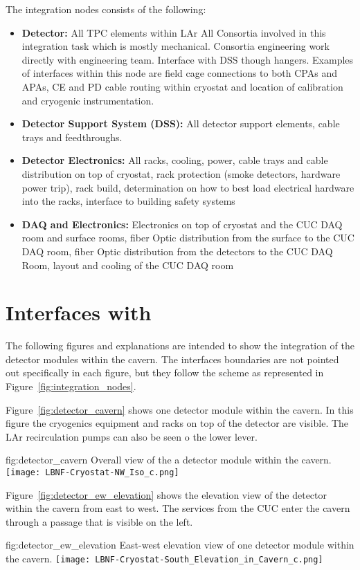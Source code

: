 The integration nodes consists of the following:
\begin{itemize}
\item {\bf Detector:} All TPC elements within LAr All Consortia involved in
  this integration task which is mostly mechanical. Consortia
  engineering work directly with  engineering team.
  Interface with DSS though hangers. Examples of interfaces within
  this node are field cage connections to both CPAs and APAs, CE and
  PD cable routing within cryostat and location of calibration and
  cryogenic instrumentation.
\item {\bf Detector Support System (DSS):} All detector support elements,
  cable trays and feedthroughs.
\item {\bf Detector Electronics:} All racks, cooling, power, cable
  trays and cable distribution on top of cryostat, rack protection
  (smoke detectors, hardware power trip), rack build, determination on
  how to best load electrical hardware into the racks, interface to
  building safety systems
\item {\bf DAQ and Electronics:} Electronics on top of cryostat and
  the CUC DAQ room and surface rooms, fiber Optic distribution from
  the surface to the CUC DAQ room, fiber Optic distribution from the
  detectors to the CUC DAQ Room, layout and cooling of the CUC DAQ
  room
\end{itemize}

\section{Interfaces with }
\label{sec:inter-lbnf-interf}
The following figures and explanations are intended to show the
integration of the detector modules within the cavern. The interfaces
boundaries are not pointed out specifically in each figure, but they
follow the scheme as represented in
Figure~\ref{fig:integration_nodes}.

Figure~\ref{fig:detector_cavern} shows one detector module within the
cavern. In this figure the cryogenics equipment and racks on top of
the detector are visible. The LAr recirculation pumps can also be seen
o the lower lever.
\begin{dunefigure}{fig:detector_cavern}
  {Overall view of the a detector module within the cavern.}
  \texttt{[image: LBNF-Cryostat-NW\_Iso\_c.png]}
\end{dunefigure}

Figure~\ref{fig:detector_ew_elevation} shows the elevation view of the
detector within the cavern from east to west. The services from the
CUC enter the cavern through a passage that is visible on the left.
\begin{dunefigure}{fig:detector_ew_elevation}
  {East-west elevation view of one detector module within the cavern.}
  \texttt{[image: LBNF-Cryostat-South\_Elevation\_in\_Cavern\_c.png]}
\end{dunefigure}

